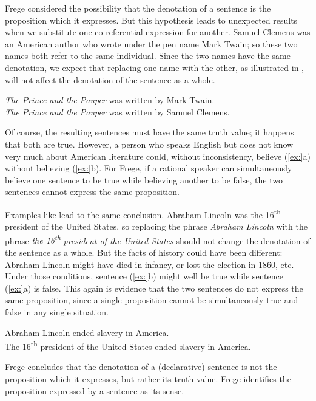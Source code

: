 Frege considered the possibility that the denotation of a sentence is the proposition which it expresses. But this hypothesis leads to unexpected results when we substitute one co-referential expression for another. Samuel Clemens was an American author who wrote under the pen name Mark Twain; so these two names both refer to the same individual. Since the two names have the same denotation, we expect that replacing one name with the other, as illustrated in , will not affect the denotation of the sentence as a whole.


\ea
\ea \textit{The Prince and the Pauper} was written by Mark Twain.\\
\ex \textit{The Prince and the Pauper} was written by Samuel Clemens.
                       \z
\z


Of course, the resulting sentences must have the same truth value; it happens that both are true. However, a person who speaks English but does not know very much about American literature could, without inconsistency, believe (\ref{ex:}a) without believing (\ref{ex:}b). For Frege, if a rational speaker can simultaneously believe one sentence to be true while believing another to be false, the two sentences cannot express the same proposition.



Examples like  lead to the same conclusion. Abraham Lincoln was the 16\textsuperscript{th} president of the United States, so replacing the phrase \textit{Abraham Lincoln} with the phrase \textit{the 16\textsuperscript{th}} \textit{president of the United States} should not change the denotation of the sentence as a whole. But the facts of history could have been different: Abraham Lincoln might have died in infancy, or lost the election in 1860, etc. Under those conditions, sentence (\ref{ex:}b) might well be true while sentence (\ref{ex:}a) is false. This again is evidence that the two sentences do not express the same proposition, since a single proposition cannot be simultaneously true and false in any single situation.


\ea
\ea Abraham Lincoln ended slavery in America.\\
\ex The 16\textsuperscript{th} president of the United States ended slavery in America.
                       \z
\z


Frege concludes that the denotation of a (declarative) sentence is not the proposition which it expresses, but rather its truth value. Frege identifies the proposition expressed by a sentence as its sense.



